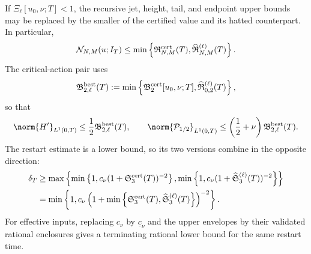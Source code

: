 \begin{corollary}
If \(\Xi_\ell[u_0,\nu;T]<1\), the recursive jet, height, tail, and endpoint
upper bounds may be replaced by the smaller of the certified value and its
hatted counterpart.  In particular,
\begin{equation}
 \mathcal N_{N,M}(u;I_T)
 \le\min\left\{
 \mathfrak R_{N,M}^{\rm cert}(T),
 \widehat{\mathfrak R}_{N,M}^{(\ell)}(T)
 \right\}.
 \label{eq:final-data-only-window}
\end{equation}
The critical-action pair uses
\begin{equation}
 \mathfrak B_{2,\ell}^{\rm best}(T)
 :=\min\left\{
  \mathfrak B_2^{\rm cert}[u_0,\nu;T],
  \widehat{\mathfrak R}_{0,2}^{(\ell)}(T)
 \right\},
 \label{eq:final-best-critical-action-coefficient}
\end{equation}
so that
\begin{equation}
 \norm{H'}_{L^1(0,T)}
 \le\frac12\mathfrak B_{2,\ell}^{\rm best}(T),
 \qquad
 \norm{\mathcal P_{1/2}}_{L^1(0,T)}
 \le\left(\frac12+\nu\right)\mathfrak B_{2,\ell}^{\rm best}(T).
 \label{eq:final-best-critical-action}
\end{equation}
The restart estimate is a lower bound, so its two versions combine in the
opposite direction:
\begin{align}
 \delta_T
 &\ge\max\left\{
  \min\left\{1,c_\nu(1+\mathfrak S_3^{\rm cert}(T))^{-2}\right\},
  \min\left\{1,c_\nu(1+\widehat{\mathfrak S}_3^{(\ell)}(T))^{-2}\right\}
 \right\}
 \notag\\
 &=\min\left\{1,
  c_\nu\left(1+\min\left\{
   \mathfrak S_3^{\rm cert}(T),
   \widehat{\mathfrak S}_3^{(\ell)}(T)
  \right\}\right)^{-2}
 \right\}.
 \label{eq:final-best-restart-lifespan}
\end{align}
For effective inputs, replacing \(c_\nu\) by \(\underline c_\nu\) and the
upper envelopes by their validated rational enclosures gives a terminating
rational lower bound for the same restart time.
\end{corollary}

